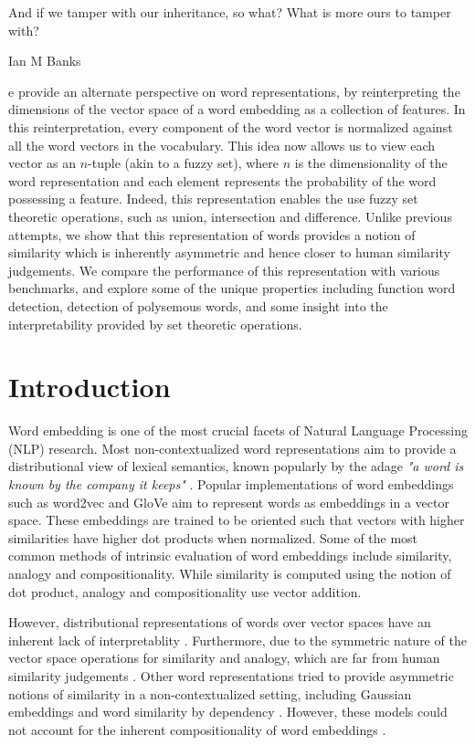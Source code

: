 \documentclass[11pt]{book}
\newcommand{\citep}[1]{\cite{#1}}
\begin{document}
\epigraph{And if we tamper with our inheritance, so what? What is more ours to tamper with?}{Ian M Banks}

e provide an alternate perspective on word representations, by
reinterpreting the dimensions of the vector space of a word embedding as a
collection of features. In this reinterpretation, every component of the word
vector is normalized against all the word vectors in the vocabulary. This idea
now allows us to view each vector as an $n$-tuple (akin to a fuzzy set), where
$n$ is the dimensionality of the word representation and each element
represents the probability of the word possessing a feature. Indeed, this
representation enables the use fuzzy set theoretic operations, such as union,
intersection and difference. Unlike previous attempts, we show that this
representation of words provides a notion of similarity which is inherently
asymmetric and hence closer to human similarity judgements. We compare the
performance of this representation with various benchmarks, and explore some of
the unique properties including function word detection, detection of
polysemous words, and some insight into the interpretability provided by set
theoretic operations.

\section{Introduction} \label{sec: intro}

Word embedding is one of the most crucial facets of Natural Language Processing
(NLP) research. Most non-contextualized word representations aim to provide a
distributional view of lexical semantics, known popularly by the adage
\textit{"a word is known by the company it keeps"} \citep{firth1957synopsis}.
Popular implementations of word embeddings such as word2vec
\citep{mikolov2013efficient} and GloVe \citep{pennington2014glove} aim to
represent words as embeddings in a vector space. These embeddings are trained
to be oriented such that vectors with higher similarities have higher dot
products when normalized. Some of the most common methods of intrinsic
evaluation of word embeddings include similarity, analogy and compositionality.
While similarity is computed using the notion of dot product, analogy and
compositionality use vector addition.

However, distributional representations of words over vector spaces have an
inherent lack of interpretablity \citep{goldberg2014word2vec}. Furthermore, due
to the symmetric nature of the vector space operations for similarity and
analogy, which are far from human similarity judgements
\citep{tversky1977features}. Other word representations tried to provide
asymmetric notions of similarity in a non-contextualized setting, including
Gaussian embeddings \citep{vilnis2014word} and word similarity by dependency
\citep{gawron2014improving}. However, these models could not account for the
inherent compositionality of word embeddings \citep{mikolov2013distributed}.
\end{document}
